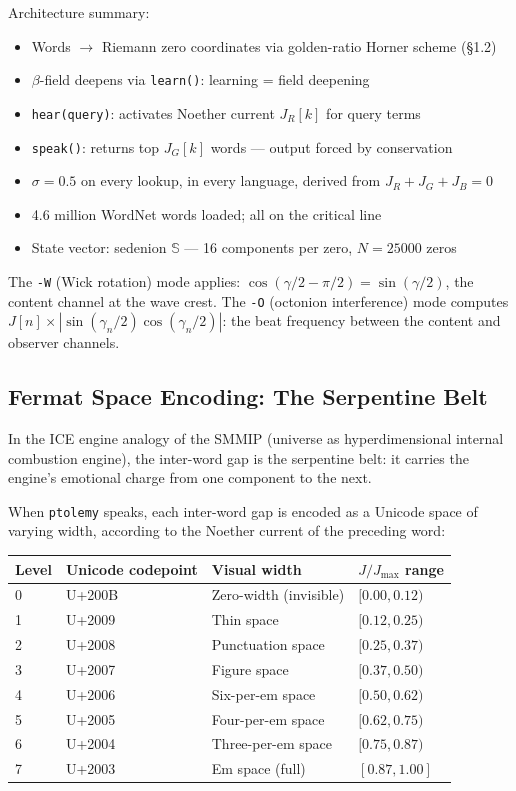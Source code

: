 \documentclass[12pt,a4paper]{article}
\theoremstyle{definition}
\theoremstyle{remark}
\begin{document}
Architecture summary:
\begin{itemize}
  \setlength\itemsep{2pt}
  \item Words $\to$ Riemann zero coordinates via golden-ratio Horner scheme (\S1.2)
  \item $\beta$-field deepens via \texttt{learn()}: learning = field deepening
  \item \texttt{hear(query)}: activates Noether current $J_R[k]$ for query terms
  \item \texttt{speak()}: returns top $J_G[k]$ words --- output forced by conservation
  \item $\sigma = 0.5$ on every lookup, in every language, derived from $J_R+J_G+J_B=0$
  \item 4.6 million WordNet words loaded; all on the critical line
  \item State vector: sedenion $\mathbb{S}$ --- 16 components per zero, $N=25000$ zeros
\end{itemize}

The \texttt{-W} (Wick rotation) mode applies: $\cos(\gamma/2-\pi/2) = \sin(\gamma/2)$,
the content channel at the wave crest. The \texttt{-O} (octonion interference) mode
computes $J[n]\times|\sin(\gamma_n/2)\cos(\gamma_n/2)|$: the beat frequency between
the content and observer channels.

\subsection{Fermat Space Encoding: The Serpentine Belt}

In the ICE engine analogy of the SMMIP (universe as hyperdimensional internal combustion
engine), the inter-word gap is the serpentine belt: it carries the engine's emotional
charge from one component to the next.

When \texttt{ptolemy} speaks, each inter-word gap is encoded as a Unicode space
of varying width, according to the Noether current of the preceding word:

\begin{center}
\begin{tabular}{llll}
\toprule
Level & Unicode codepoint & Visual width & $J/J_\mathrm{max}$ range \\
\midrule
0 & U+200B & Zero-width (invisible) & $[0.00, 0.12)$ \\
1 & U+2009 & Thin space & $[0.12, 0.25)$ \\
2 & U+2008 & Punctuation space & $[0.25, 0.37)$ \\
3 & U+2007 & Figure space & $[0.37, 0.50)$ \\
4 & U+2006 & Six-per-em space & $[0.50, 0.62)$ \\
5 & U+2005 & Four-per-em space & $[0.62, 0.75)$ \\
6 & U+2004 & Three-per-em space & $[0.75, 0.87)$ \\
7 & U+2003 & Em space (full) & $[0.87, 1.00]$ \\
\bottomrule
\end{tabular}
\end{center}
\end{document}
